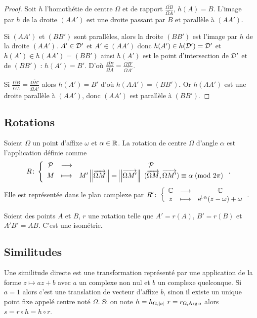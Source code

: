 \begin{proof}
  Soit \(h\) l'homothétie de centre \(\Omega\) et de rapport 
  \(\frac{\overline{\Omega B}}{\overline{\Omega A}}\), \(h(A) = B\). 
  L'image par \(h\) de la droite \((AA')\) est une droite passant par 
  \(B\) et parallèle à \((AA')\).

  Si \((AA')\) et \((BB')\) sont parallèles, alors la droite \((BB')\) 
  est l'image par \(h\) de la droite \((AA')\). \(A' \in \mathcal{D}'\) et \(A' 
  \in (AA')\) donc \(h(A') \in h(\mathcal{D}') = \mathcal{D}'\) et \(h(A') \in h(AA') = 
  (BB')\) ainsi \(h(A')\) est le point d'intersection de \(\mathcal{D}'\) et de 
  \((BB')\) : \(h(A') = B'\). D'où \(\frac{\overline{\Omega 
  B}}{\overline{\Omega A}} = \frac{\overline{\Omega 
  B'}}{\overline{\Omega A'}}\).

  Si \(\frac{\overline{\Omega B}}{\overline{\Omega A}} = 
  \frac{\overline{\Omega B'}}{\overline{\Omega A'}}\) alors \(h(A') = 
  B'\) d'où \(h(AA') = (BB')\). Or \(h(AA')\) est une droite parallèle à 
  \((AA')\), donc \((AA')\) est parallèle à \((BB')\).
\end{proof}

\subsection{Rotations}

\begin{defdef}
  Soient \(\Omega\) un point d'affixe \(\omega\) et \(\alpha \in \mathbb{R}\). 
  La rotation de centre \(\Omega\) d'angle \(\alpha\) est l'application 
  définie comme \begin{equation}
    R\colon \left\{\begin{array}{ccc} \mathcal{P} & \longrightarrow &\mathcal{P}\\ M & \longmapsto & M' \left\lVert\overrightarrow{\Omega M}\right\rVert= 
      \left\lVert\overrightarrow{\Omega M'}\right\rVert \ (\overrightarrow{\Omega M},\overrightarrow{\Omega 
    M'}) \equiv \alpha\!\pmod {2\pi} \end{array} \right..
  \end{equation}
  Elle est représentée dans le plan complexe par 
  \(R'\colon \left\{\begin{array}{ccc} \mathbb{C} & \longrightarrow &\mathbb{C}\\ z & \longmapsto & \operatorname{e}^{\operatorname{i} \alpha}(z - \omega) + \omega \end{array} \right.\).
\end{defdef}

\begin{prop}
  Soient des points \(A\) et \(B\), \(r\) une rotation telle que \(A' = 
  r(A)\), \(B' = r(B)\) et \(A'B' = AB\). C'est une isométrie.
\end{prop}

\subsection{Similitudes}

Une similitude directe est une transformation représenté par une 
application de la forme \(z \longmapsto az + b\) avec \(a\) un complexe 
non nul et \(b\) un complexe quelconque. Si \(a = 1\) alors c'est une 
translation de vecteur d'affixe \(b\), sinon il existe un unique point 
fixe appelé centre noté \(\Omega\). Si on note \(h = h_{\Omega, \abs{a}} \ 
r = r_{\Omega, \Arg{a}}\) alors \(s = r \circ h = h \circ r\).

